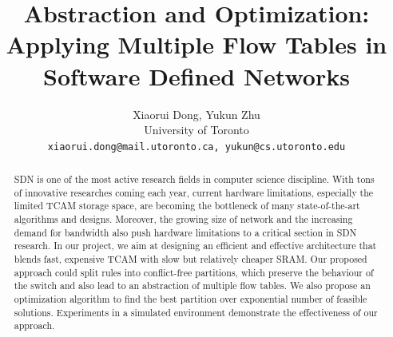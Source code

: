\documentclass[10pt,twocolumn,letterpaper]{article}
\begin{document}
\title{ Abstraction and Optimization: Applying Multiple Flow Tables in Software Defined Networks}

\author{
Xiaorui Dong, Yukun Zhu\\
University of Toronto\\
{\tt\small xiaorui.dong@mail.utoronto.ca, yukun@cs.utoronto.edu}
}

\maketitle

\begin{abstract}
SDN is one of the most active research fields in computer science discipline. With tons of innovative researches coming each year, current hardware limitations, especially the limited TCAM storage space, are becoming the bottleneck of many state-of-the-art algorithms and designs. Moreover, the growing size of network and the increasing demand for bandwidth also push hardware limitations to a critical section in SDN research. In our project, we aim at designing an efficient and effective architecture that blends fast, expensive TCAM with slow but relatively cheaper SRAM. Our proposed approach could split rules into conflict-free partitions, which preserve the behaviour of the switch and also lead to an abstraction of multiple flow tables. We also propose an optimization algorithm to find the best partition over exponential number of feasible solutions. Experiments in a simulated environment demonstrate the effectiveness of our approach. 

\end{abstract}



\tableofcontents
\end{document}
